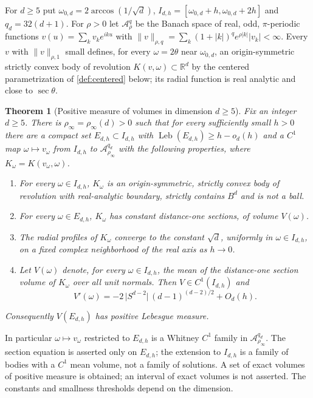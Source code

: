 \documentclass[11pt]{amsart}
\numberwithin{equation}{section}
\newtheorem{theorem}{Theorem}[section]
\theoremstyle{definition}
\theoremstyle{remark}
\newcommand{\R}{\mathbb{R}}
\newcommand{\abs}[1]{\lvert #1\rvert}
\newcommand{\norm}[1]{\lVert #1\rVert}
\newcommand{\Leb}{\operatorname{Leb}}
\newcommand{\Wn}{\mathcal A}
\begin{document}
For $d\ge5$ put $\omega_{0,d}=2\arccos(1/\sqrt d)$, $I_{d,h}=[\omega_{0,d}+h,\omega_{0,d}+2h]$ and $q_d=32(d+1)$. For $\rho>0$ let $\Wn^{q}_{\rho}$ be the Banach space of real, odd, $\pi$-periodic functions $v(u)=\sum_kv_ke^{iku}$ with $\norm v_{\rho,q}=\sum_k(1+\abs k)^qe^{\rho\abs k}\abs{v_k}<\infty$. Every $v$ with $\norm v_{\rho,1}$ small defines, for every $\omega=2\theta$ near $\omega_{0,d}$, an origin-symmetric strictly convex body of revolution $K(v,\omega)\subset\R^d$ by the centered parametrization of \cref{def:centered} below; its radial function is real analytic and close to $\sec\theta$.

\begin{theorem}[Positive measure of volumes in dimension $d\ge5$]\label{thm:dge5}
Fix an integer $d\ge5$. There is $\rho_\infty=\rho_\infty(d)>0$ such that for every sufficiently small $h>0$ there are a compact set $E_{d,h}\subset I_{d,h}$ with $\Leb(E_{d,h})\ge h-o_d(h)$ and a $C^1$ map $\omega\mapsto v_\omega$ from $I_{d,h}$ to $\Wn^{q_d}_{\rho_\infty}$ with the following properties, where $K_\omega=K(v_\omega,\omega)$.
\begin{enumerate}[label=\textup{(\roman*)}]
\item For every $\omega\in I_{d,h}$, $K_\omega$ is an origin-symmetric, strictly convex body of revolution with real-analytic boundary, strictly contains $B^d$ and is not a ball.
\item For every $\omega\in E_{d,h}$, $K_\omega$ has constant distance-one sections, of volume $V(\omega)$.
\item The radial profiles of $K_\omega$ converge to the constant $\sqrt d$, uniformly in $\omega\in I_{d,h}$, on a fixed complex neighborhood of the real axis as $h\to0$.
\item Let $V(\omega)$ denote, for every $\omega\in I_{d,h}$, the mean of the distance-one section volume of $K_\omega$ over all unit normals. Then $V\in C^1(I_{d,h})$ and
\[
V'(\omega)=-2\,\abs{S^{d-2}}\,(d-1)^{(d-2)/2}+O_d(h).
\]
\end{enumerate}
Consequently $V(E_{d,h})$ has positive Lebesgue measure.
\end{theorem}

In particular $\omega\mapsto v_\omega$ restricted to $E_{d,h}$ is a Whitney $C^1$ family in $\Wn^{q_d}_{\rho_\infty}$. The section equation is asserted only on $E_{d,h}$; the extension to $I_{d,h}$ is a family of bodies with a $C^1$ mean volume, not a family of solutions. A set of exact volumes of positive measure is obtained; an interval of exact volumes is not asserted. The constants and smallness thresholds depend on the dimension.
\end{document}
